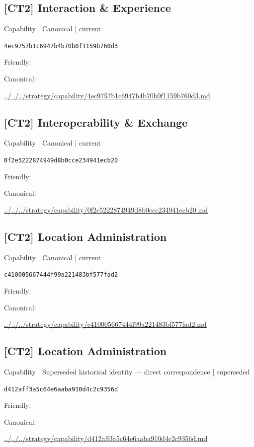 \documentclass[10pt,a4paper]{article}
\begin{document}
\subsection*{[CT2] Interaction \& Experience}
{\small Capability | Canonical | current}\par
\texttt{4ec9757b1c6947b4b70b0f1159b760d3}\par
Friendly: \par
Canonical: \par
{\footnotesize\url{../../../strategy/capability/4ec9757b1c6947b4b70b0f1159b760d3.md}}\par
\subsection*{[CT2] Interoperability \& Exchange}
{\small Capability | Canonical | current}\par
\texttt{0f2e5222874949d8b0cce234941ecb20}\par
Friendly: \par
Canonical: \par
{\footnotesize\url{../../../strategy/capability/0f2e5222874949d8b0cce234941ecb20.md}}\par
\subsection*{[CT2] Location Administration}
{\small Capability | Canonical | current}\par
\texttt{c410005667444f99a221483bf577fad2}\par
Friendly: \par
Canonical: \par
{\footnotesize\url{../../../strategy/capability/c410005667444f99a221483bf577fad2.md}}\par
\subsection*{[CT2] Location Administration}
{\small Capability | Superseded historical identity — direct correspondence | superseded}\par
\texttt{d412aff3a5c64e6aaba910d4c2c9356d}\par
Friendly: \par
Canonical: \par
{\footnotesize\url{../../../strategy/capability/d412aff3a5c64e6aaba910d4c2c9356d.md}}\par
\end{document}
